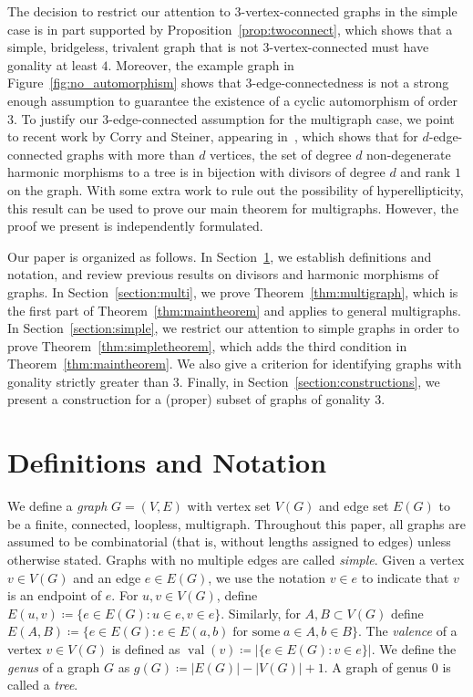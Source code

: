 \documentclass[ALCO,ThmDefs,Unicode,epreuves]{cedram}
\DeclareMathOperator{\val}{val}
\begin{document}
The decision to restrict our attention to $3$-vertex-connected graphs in the simple case is in part supported by Proposition~\ref{prop:twoconnect}, which shows that a simple, bridgeless, trivalent graph that is not $3$-vertex-connected must have gonality at least $4$. Moreover, the example graph in Figure~\ref{fig:no_automorphism} shows that $3$-edge-connectedness is not a strong enough assumption to guarantee the existence of a cyclic automorphism of order $3$. To justify our $3$-edge-connected assumption for the multigraph case, we point to recent work by Corry and Steiner, appearing in~\cite[Theorem~10.24]{cp}, which shows that for $d$-edge-connected graphs with more than $d$ vertices, the set of degree $d$ non-degenerate harmonic morphisms to a tree is in bijection with divisors of degree $d$ and rank $1$ on the graph. With some extra work to rule out the possibility of hyperellipticity, this result can be used to prove our main theorem for multigraphs. However, the proof we present is independently formulated.

\setcounter{section}{1}

Our paper is organized as follows. In Section~\ref{section:definitions}, we establish definitions and notation, and review previous results on divisors and harmonic morphisms of graphs. In Section~\ref{section:multi}, we prove Theorem~\ref{thm:multigraph}, which is the first part of Theorem~\ref{thm:maintheorem} and applies to general multigraphs. In Section~\ref{section:simple}, we restrict our attention to simple graphs in order to prove Theorem~\ref{thm:simpletheorem}, which adds the third condition in Theorem~\ref{thm:maintheorem}. We also give a criterion for identifying graphs with gonality strictly greater than $3$. Finally, in Section~\ref{section:constructions}, we present a construction for a (proper) subset of graphs of gonality $3$.

\section{Definitions and Notation}
\label{section:definitions}

We define a \emph{graph} $G = (V, E)$ with vertex set $V(G)$ and edge set $E(G)$ to be a finite, connected, loopless, multigraph. Throughout this paper, all graphs are assumed to be combinatorial (that is, without lengths assigned to edges) unless otherwise stated. Graphs with no multiple edges are called \emph{simple}. Given a vertex $v \in V(G)$ and an edge $e \in E(G)$, we use the notation $v \in e$ to indicate that $v$ is an endpoint of $e$. For $u,v \in V(G)$, define $E(u,v) \coloneqq \{ e \in E(G) : u \in e, v \in e\}$. Similarly, for $A, B \subset V(G)$ define $E(A, B) \coloneqq \{ e \in E(G) : e \in E(a, b) \; \text{for some} \; a \in A, b \in B\}$. The \emph{valence} of a vertex $v \in V(G)$ is defined as $\val (v) \coloneqq |\{ e \in E(G) : v \in e \}|$. We define the \emph{genus} of a graph $G$ as $g(G) \coloneqq |E(G)| - |V(G)| + 1$. A graph of genus 0 is called a \emph{tree}.
\end{document}

